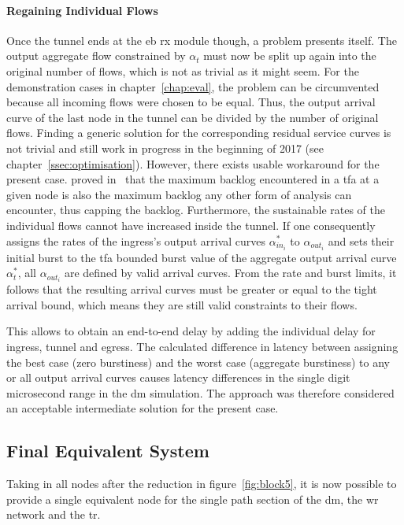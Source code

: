 \paragraph{Regaining Individual Flows}
Once the tunnel ends at the \gls{eb} \gls{rx} module though, a problem presents itself. The output aggregate flow constrained by $\alpha_t$ must now be split up again into the original number of flows, which is not as trivial as it might seem.
For the demonstration cases in chapter~\ref{chap:eval}, the problem can be circumvented because all incoming flows were chosen to be equal. Thus, the output arrival curve of the last node in the tunnel can be divided by the number of original flows.
Finding a generic solution for the corresponding residual service curves is not trivial and still work in progress in the beginning of 2017 (see chapter~\ref{ssec:optimisation}). However, there exists usable workaround for the present case.
\citeauthor{bondorf_improving_2016} proved in~\cite{bondorf_improving_2016} that the maximum backlog encountered in a \gls{tfa} at a given node is also the maximum backlog any other form of analysis can encounter, thus capping the backlog.
Furthermore, the sustainable rates of the individual flows cannot have increased inside the tunnel. If one consequently assigns the rates of the ingress's output arrival curves $\alpha^*_{{in}_i}$ to $\alpha_{{out}_i}$ and sets their initial burst to the \gls{tfa} bounded burst value of the aggregate output arrival curve $\alpha_t^*$, all $\alpha_{{out}_i}$ are defined by valid arrival curves. From the rate and burst limits, it follows that the resulting arrival curves must be greater or equal to the tight arrival bound, which means they are still valid constraints to their flows.
\par
This allows to obtain an end-to-end delay by adding the individual delay for ingress, tunnel and egress.   The calculated difference in latency between assigning the best case (zero burstiness) and the worst case (aggregate burstiness) to any or all output arrival curves causes latency differences in the single digit microsecond range in the \gls{dm} simulation. The approach was therefore considered an acceptable intermediate solution for the present case.

\iffalse
\subsection{Final Equivalent System}
Taking in all nodes after the reduction in figure~\ref{fig:block5}, it is now possible to provide a single equivalent node for the single path section of the \gls{dm}, the \gls{wr} network and the \gls{tr}.

